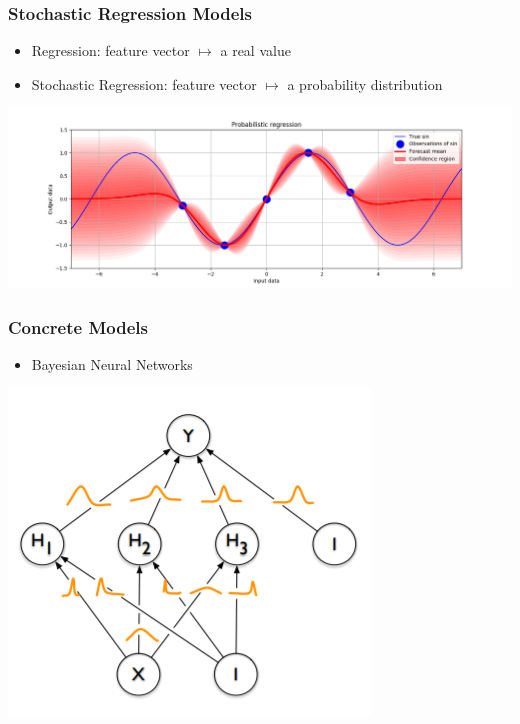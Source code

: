 \documentclass[18pt]{beamer}
\begin{document}
\begin{frame}
  \frametitle{Stochastic Regression Models}
  \begin{itemize}
  \item Regression: feature vector $\mapsto$ a real value
  \item Stochastic Regression: feature vector $\mapsto$ a probability distribution
  \end{itemize}
  \includegraphics[scale=0.35]{images/probabilistic_regression}
\end{frame}

\begin{frame}
  \frametitle{Concrete Models}
  \begin{itemize}
  \item Bayesian Neural Networks
  \end{itemize}
  \begin{center}
    \includegraphics[scale=0.5]{images/bnn}
  \end{center}
\end{frame}
\end{document}
